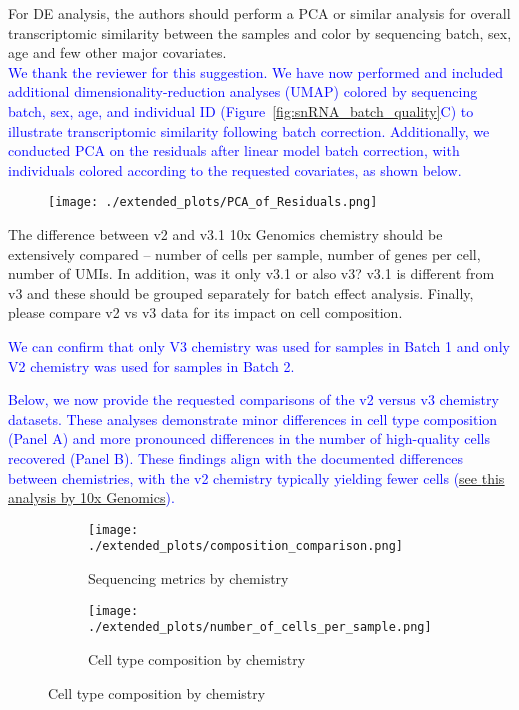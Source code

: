 For DE analysis, the authors should perform a PCA or similar analysis for overall transcriptomic similarity between the samples and color by sequencing batch, sex, age and few other major covariates.\\
\textcolor{blue}{We thank the reviewer for this suggestion. We have now performed and included additional dimensionality-reduction analyses (UMAP) colored by sequencing batch, sex, age, and individual ID (Figure~\ref{fig:snRNA_batch_quality}C) to illustrate transcriptomic similarity following batch correction. Additionally, we conducted PCA on the residuals after linear model batch correction, with individuals colored according to the requested covariates, as shown below.}

\begin{figure}[H]
	\texttt{[image: ./extended\_plots/PCA\_of\_Residuals.png]}        
\end{figure}

The difference between v2 and v3.1 10x Genomics chemistry should be extensively compared – number of cells per sample, number of genes per cell, number of UMIs. In addition, was it only v3.1 or also v3? v3.1 is different from v3 and these should be grouped separately for batch effect analysis. Finally, please compare v2 vs v3 data for its impact on cell composition.

\textcolor{blue}{We can confirm that only V3 chemistry was used for samples in Batch 1 and only V2 chemistry was used for samples in Batch 2.}

\textcolor{blue}{Below, we now provide the requested comparisons of the v2 versus v3 chemistry datasets. These analyses demonstrate minor differences in cell type composition (Panel A) and more pronounced differences in the number of high-quality cells recovered (Panel B). These findings align with the documented differences between chemistries, with the v2 chemistry typically yielding fewer cells (\href{https://kb.10xgenomics.com/hc/en-us/articles/360026501692-Do-we-see-a-difference-in-the-expression-profile-of-3-Single-Cell-v3-chemistry-compared-to-v2-chemistry}{see \underline{this analysis} by 10x Genomics}).}

\begin{figure}[H]
	\begin{subfigure}[t]{0.33\textwidth}
		\caption{Sequencing metrics by chemistry}
		\texttt{[image: ./extended\_plots/composition\_comparison.png]}        
	\end{subfigure} 
	\begin{subfigure}[t]{0.65\textwidth}
		\caption{Cell type composition by chemistry}
		\texttt{[image: ./extended\_plots/number\_of\_cells\_per\_sample.png]}        
	\end{subfigure} 
\end{figure}


